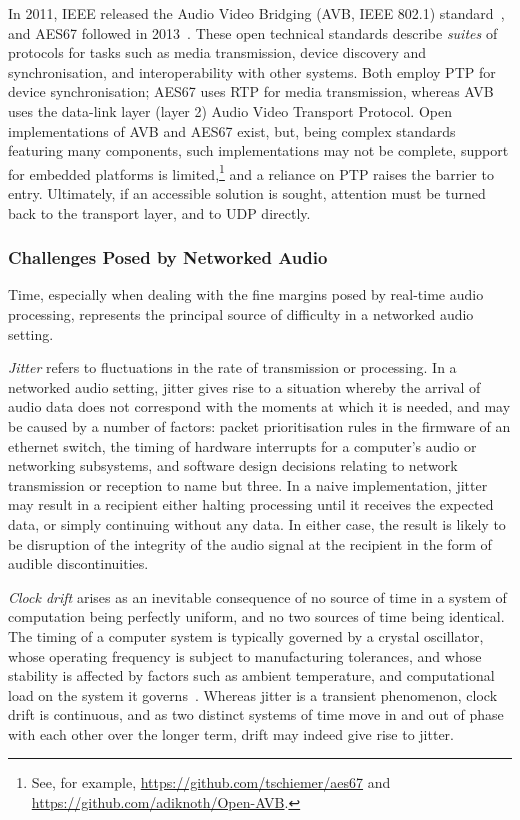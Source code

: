 \documentclass[utf8]{FrontiersinHarvard}
\begin{document}
    In 2011, IEEE released the Audio Video Bridging (AVB, IEEE 802.1)
    standard~\citep{ieee_ieee_2011}, and AES67 followed in
    2013~\citep{hildebrand_aes67-2013_2014}.
    These open technical standards describe \textit{suites} of protocols for
    tasks such as media transmission, device discovery and
    synchronisation, and interoperability with other systems.
    Both employ PTP for device synchronisation; AES67 uses RTP for media
    transmission, whereas AVB uses the data-link layer (layer 2) Audio Video
    Transport Protocol.
    Open implementations of AVB and AES67 exist, but, being complex standards
    featuring many components, such implementations may not be complete, support
    for embedded platforms is limited,\footnote{
        See, for example, \url{https://github.com/tschiemer/aes67} and
        \url{https://github.com/adiknoth/Open-AVB}.
    } and a reliance on
    PTP raises the barrier to entry.
    Ultimately, if an accessible solution is sought, attention must be turned
    back to the transport layer, and to UDP directly.

    \subsubsection{Challenges Posed by Networked Audio}\label{subsubsec:challenges}

    Time, especially when dealing with the fine margins posed by real-time audio
    processing, represents the principal source of difficulty in a networked
    audio setting.

    \textit{Jitter} refers to fluctuations in the rate of transmission or
    processing.
    In a networked audio setting, jitter gives rise to a situation whereby the
    arrival of audio data does not correspond with the moments at which it is
    needed, and may be caused by a number of factors: packet prioritisation
    rules in the firmware of an ethernet switch, the timing of hardware
    interrupts for a computer's audio or networking subsystems, and software
    design decisions relating to network transmission or reception to name but
    three.
    In a naive implementation, jitter may result in a recipient either halting
    processing until it receives the expected data, or simply continuing without
    any data.
    In either case, the result is likely to be disruption of the integrity of
    the audio signal at the recipient in the form of audible discontinuities.

    \textit{Clock drift} arises as an inevitable consequence of no source of
    time in a system of computation being perfectly uniform, and no two sources
    of time being identical.
    The timing of a computer system is typically governed by a crystal
    oscillator, whose operating frequency is subject to manufacturing
    tolerances, and whose stability is affected by factors such as ambient
    temperature, and computational load on the system it
    governs~\citep{marouani_internal_2008}.
    Whereas jitter is a transient phenomenon, clock drift is continuous, and as
    two distinct systems of time move in and out of phase with each other over
    the longer term, drift may indeed give rise to jitter.
\end{document}
